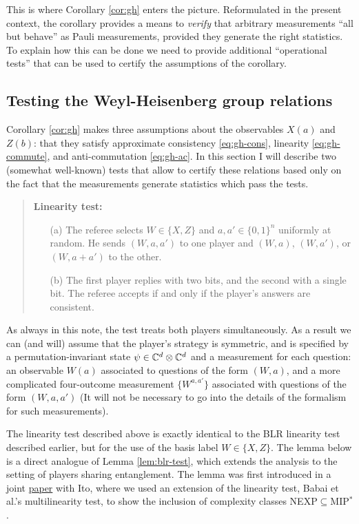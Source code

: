 This is where Corollary \ref{cor:gh} enters the picture. Reformulated in the present context, the corollary provides a means to \emph{verify} that arbitrary measurements ``all but behave'' as Pauli measurements, provided they generate the right statistics. To explain how this can be done we need to provide additional ``operational tests'' that can be used to certify  the assumptions of the corollary. 


\subsection{Testing the Weyl-Heisenberg group relations}

Corollary \ref{cor:gh} makes three assumptions about the observables $X(a)$ and $Z(b)$: that they satisfy approximate consistency \eqref{eq:gh-cons}, linearity \eqref{eq:gh-commute}, and anti-commutation \eqref{eq:gh-ac}. In this section I will describe two (somewhat well-known)  tests that allow to certify these relations based only on the fact that the measurements generate statistics which pass the tests. 

\begin{quote}
\textbf{Linearity test:}
\begin{itemize}
\item[(a)] The referee selects $W\in\{X,Z\}$ and $a,a'\in\{0,1\}^n$ uniformly at random. He sends $(W,a,a')$ to one player and $(W,a)$, $(W,a')$, or $(W,a+a')$ to the other. 
\item[(b)] The first player replies with two bits, and the second with a single bit. The referee accepts if and only if the player's answers are consistent. 
\end{itemize}
\end{quote}

As always in this note, the test treats both players simultaneously. As a result we can (and will) assume that the player's strategy is symmetric, and is specified by a permutation-invariant state $\psi\in \mathbb{C}^d \otimes \mathbb{C}^d$ and a measurement for each question: an observable $W(a)$ associated to questions of the form $(W,a)$, and a more complicated four-outcome measurement $\{W^{a,a'}\}$ associated with questions of the form $(W,a,a')$ (It will not be necessary to go into the details of the formalism for such measurements). 

The linearity test described above is exactly identical to the BLR linearity test described earlier, but for the use of the basis label $W\in\{X,Z\}$. The lemma below is a direct analogue of Lemma \ref{lem:blr-test}, which extends the analysis to the setting of players sharing entanglement. The lemma was first introduced in a joint \href{http://ieeexplore.ieee.org/abstract/document/6375302/}{paper} with Ito, where we used an extension of the linearity test, Babai et al.'s multilinearity test, to show the inclusion of complexity classes NEXP$\subseteq$MIP$^*$.
 
